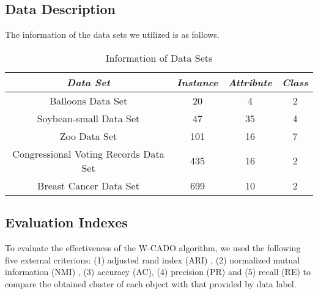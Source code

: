 \documentclass[review]{elsarticle}
\begin{document}
\subsection{Data Description}
The information of the data sets we utilized is as follows.
\begin{table}[!h]\tabcolsep=0.065in
\centering
\caption{Information of Data Sets}
\small
\label{tab:Information of data sets}
\begin{tabular}{cccc}
\hline
\emph{Data Set}&\emph{Instance}&\emph{Attribute}&\emph{Class} \\
\hline
Balloons Data Set                       & 20  & 4   & 2 \\
Soybean-small Data Set                  & 47  & 35  & 4 \\
Zoo Data Set                            & 101 & 16  & 7 \\
Congressional Voting Records Data Set   & 435 & 16  & 2 \\
Breast Cancer Data Set                  & 699 & 10  & 2 \\
\hline
\end{tabular}
\end{table}

\subsection{Evaluation Indexes}
To evaluate the effectiveness of the W-CADO algorithm, we used the following five external criterions: (1) adjusted rand index (ARI) \cite{Liang2012The}, (2) normalized mutual information (NMI) \cite{strehl2003cluster}, (3) accuracy (AC), (4) precision (PR) and (5) recall (RE) to compare the obtained cluster of each object with that provided by data label.
\end{document}
